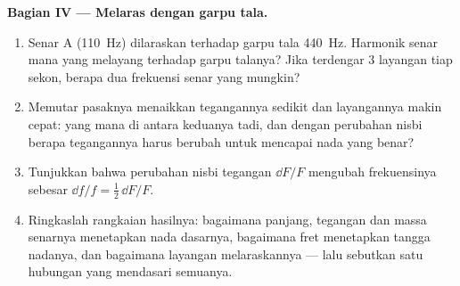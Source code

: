 \begin{problem}
\medskip
\noindent\textbf{Bagian IV --- Melaras dengan garpu tala.}
\begin{enumerate}[resume]
  \item Senar A (\qty{110}{Hz}) dilaraskan terhadap garpu tala
        \qty{440}{Hz}. Harmonik senar mana yang melayang terhadap garpu
        talanya? Jika terdengar \qty{3}{} layangan tiap sekon, berapa
        dua frekuensi senar yang mungkin?
  \item Memutar pasaknya menaikkan tegangannya sedikit dan layangannya
        makin cepat: yang mana di antara keduanya tadi, dan dengan
        perubahan nisbi berapa tegangannya harus berubah untuk mencapai
        nada yang benar?
  \item Tunjukkan bahwa perubahan nisbi tegangan $\dd F/F$ mengubah
        frekuensinya sebesar $\dd f/f = \tfrac12\,\dd F/F$.
  \item Ringkaslah rangkaian hasilnya: bagaimana panjang, tegangan dan
        massa senarnya menetapkan nada dasarnya, bagaimana fret
        menetapkan tangga nadanya, dan bagaimana layangan melaraskannya
        --- lalu sebutkan satu hubungan yang mendasari semuanya.
\end{enumerate}
\end{problem}
